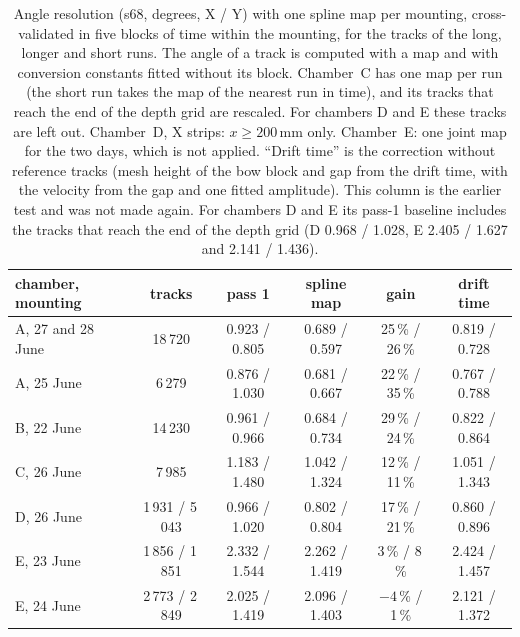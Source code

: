 \begin{table}[tbp]
  \centering
  \caption{Angle resolution (s68, degrees, X / Y) with one spline map per mounting, cross-validated in five blocks
  of time within the mounting, for the tracks of the long, longer and short runs. The angle of a track is computed with
  a map and with conversion constants fitted without its block. Chamber~C has one map per run (the short run takes the
  map of the nearest run in time), and its tracks that reach the end of the depth grid are rescaled. For chambers D and
  E these tracks are left out. Chamber~D, X strips: $x\ge200$\,mm only. Chamber~E: one joint map for the two days,
  which is not applied. ``Drift time'' is the correction without reference tracks (mesh height of the bow block and
  gap from the drift time, with the velocity from the gap and one fitted amplitude). This column is the earlier test
  and was not made again. For chambers D and E its pass-1 baseline includes the tracks that reach the end of the depth
  grid (D 0.968 / 1.028, E 2.405 / 1.627 and 2.141 / 1.436).}
  \label{tab:mapall}
  \small
  \begin{tabular}{lccccc}
    \hline
    chamber, mounting & tracks & pass 1 & spline map & gain & drift time \\
    \hline
    A, 27 and 28 June & 18\,720 & 0.923 / 0.805 & 0.689 / 0.597 & 25\,\% / 26\,\% & 0.819 / 0.728 \\
    A, 25 June        & 6\,279  & 0.876 / 1.030 & 0.681 / 0.667 & 22\,\% / 35\,\% & 0.767 / 0.788 \\
    B, 22 June        & 14\,230 & 0.961 / 0.966 & 0.684 / 0.734 & 29\,\% / 24\,\% & 0.822 / 0.864 \\
    C, 26 June        & 7\,985  & 1.183 / 1.480 & 1.042 / 1.324 & 12\,\% / 11\,\% & 1.051 / 1.343 \\
    D, 26 June        & 1\,931 / 5\,043 & 0.966 / 1.020 & 0.802 / 0.804 & 17\,\% / 21\,\% & 0.860 / 0.896 \\
    E, 23 June        & 1\,856 / 1\,851 & 2.332 / 1.544 & 2.262 / 1.419 & 3\,\% / 8\,\% & 2.424 / 1.457 \\
    E, 24 June        & 2\,773 / 2\,849 & 2.025 / 1.419 & 2.096 / 1.403 & $-4$\,\% / 1\,\% & 2.121 / 1.372 \\
    \hline
  \end{tabular}
\end{table}

